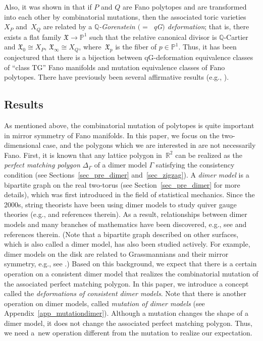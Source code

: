 \documentclass[pdftex]{sigma}%
\numberwithin{equation}{section}
\numberwithin{figure}{section}
\numberwithin{table}{section}
\newcommand{\QQ}{\mathbb{Q}}
\newcommand{\RR}{\mathbb{R}}
\newcommand{\PP}{\mathbb{P}}
\newcommand{\fkX}{\mathfrak{X}}
\begin{document}
Also, it was shown in \cite{Ilt} that if $P$ and $Q$ are Fano polytopes and are transformed into each other by combinatorial mutations,
then the associated toric varieties~$X_P$ and~$X_Q$ are related by a \emph{$\QQ$-Gorenstein $(=$~qG$)$ deformation}; that is, there exists a flat family $\fkX\rightarrow\PP^1$ such that the relative canonical divisor is $\QQ$-Cartier and $\fkX_0\cong X_P$, $\fkX_\infty\cong X_Q$, where~$\fkX_p$ is the fiber of $p\in\PP^1$.
Thus, it has been conjectured that there is a bijection between qG-deformation equivalence classes of ``class TG'' Fano manifolds and mutation equivalence classes of Fano polytopes. There have previously been several affirmative results (e.g., \cite{Akhtar_etc,KNP}).

\subsection{Results}
As mentioned above, the combinatorial mutation of polytopes is quite important in mirror symmetry of Fano manifolds.
In this paper, we focus on the two-dimensional case, and the polygons which we are interested in are not necessarily Fano.
First, it is known that any lattice polygon in~$\RR^2$ can be realized as the \emph{perfect matching polygon} $\Delta_\Gamma$ of a dimer model $\Gamma$ satisfying the consistency condition (see Sections~\ref{sec_pre_dimer} and~\ref{sec_zigzag}).
A \emph{dimer model} is a bipartite graph on the real two-torus (see Section~\ref{sec_pre_dimer} for more details), which was first introduced in the field of statistical mechanics.
Since the 2000s, string theorists have been using dimer models to study quiver gauge theories (e.g., \cite{FHK,HV,Kenn,Keny} and references therein).
As a result, relationships between dimer models and many branches of mathematics have been discovered, e.g., see \cite{Boc_abc} and references therein.
(Note that a bipartite graph described on other surfaces, which is also called a dimer model, has also been studied actively.
For example, dimer models on the disk are related to Grassmannians and their mirror symmetry, e.g., see \cite{HN, RW}.)
Based on this background, we expect that there is a certain operation on a consistent dimer model that realizes
the combinatorial mutation of the associated perfect matching polygon.
In this paper, we introduce a concept called the \emph{deformations of consistent dimer models}.
Note that there is another operation on dimer models, called \emph{mutation of dimer models} (see Appendix~\ref{app_mutationdimer}).
Although a mutation changes the shape of a dimer model, it does not change the associated perfect matching polygon.
Thus, we need a~new operation different from the mutation to realize our expectation.
\end{document}

